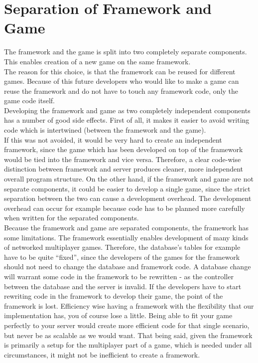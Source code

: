 \section{Separation of Framework and Game}
The framework and the game is split into two completely separate components. This enables creation of a new game on the same framework.\\

The reason for this choice, is that the framework can be reused for different games. Because of this future developers who would like to make a game can reuse the framework and do not have to touch any framework code, only the game code itself.\\
Developing the framework and game as two completely independent components has a number of good side effects. First of all, it makes it easier to avoid writing code which is intertwined (between the framework and the game).\\

If this was not avoided, it would be very hard to create an independent framework, since the game which has been developed on top of the framework would be tied into the framework and vice versa. Therefore, a clear code-wise distinction between framework and server produces cleaner, more independent overall program structure. On the other hand, if the framework and game are not separate components, it could be easier to develop a single game, since the strict separation between the two can cause a development overhead. The development overhead can occur for example because code has to be planned more carefully when written for the separated components.\\

Because the framework and game are separated components, the framework has some limitations. The framework essentially enables development of many kinds of networked multiplayer games. Therefore, the database's tables for example have to be quite ``fixed'', since the developers of the games for the framework should not need to change the database and framework code. A database change will warrant some code in the framework to be rewritten - as the controller between the database and the server is invalid. If the developers have to start rewriting code in the framework to develop their game, the point of the framework is lost. 
Efficiency wise having a framework with the flexibility that our implementation has, you of course lose a little. Being able to fit your game perfectly to your server would create more efficient code for that single scenario, but never be as scalable as we would want. That being said, given the framework is primarily a setup for the multiplayer part of a game, which is needed under all circumstances, it might not be inefficient to create a framework.
